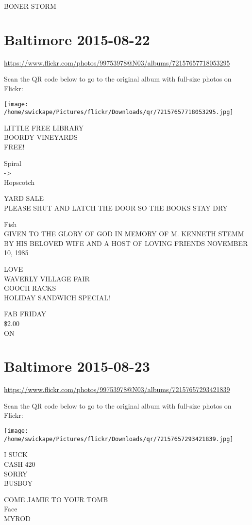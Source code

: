 \documentclass[10pt,letterpaper]{article}
\begin{document}
BONER STORM


\section*{Baltimore 2015-08-22}

\url{https://www.flickr.com/photos/99753978@N03/albums/72157657718053295}

Scan the QR code below to go to the original album with full-size photos on Flickr:

\texttt{[image: /home/swickape/Pictures/flickr/Downloads/qr/72157657718053295.jpg]}


LITTLE FREE LIBRARY\\
BOORDY VINEYARDS\\
FREE!

Spiral\\
{-}>\\
Hopscotch

YARD SALE\\
PLEASE SHUT AND LATCH THE DOOR SO THE BOOKS STAY DRY

Fish\\
GIVEN TO THE GLORY OF GOD IN MEMORY OF M. KENNETH STEMM BY HIS BELOVED WIFE AND A HOST OF LOVING FRIENDS NOVEMBER 10, 1985

LOVE\\
WAVERLY VILLAGE FAIR\\
GOOCH RACKS\\
HOLIDAY SANDWICH SPECIAL!

FAB FRIDAY\\
\$2.00\\
ON


\section*{Baltimore 2015-08-23}

\url{https://www.flickr.com/photos/99753978@N03/albums/72157657293421839}

Scan the QR code below to go to the original album with full-size photos on Flickr:

\texttt{[image: /home/swickape/Pictures/flickr/Downloads/qr/72157657293421839.jpg]}


I SUCK\\
CASH 420\\
SORRY\\
BUSBOY

COME JAMIE TO YOUR TOMB\\
Face\\
MYROD
\end{document}
